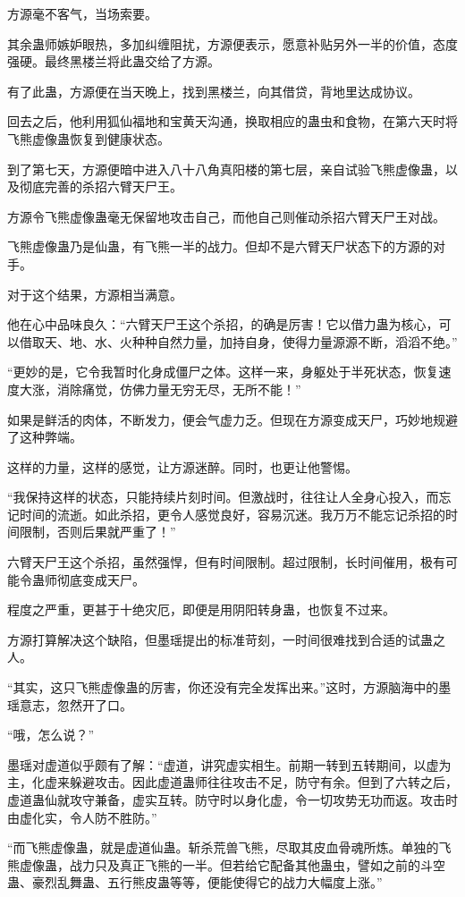 \begin{this_body}
方源毫不客气，当场索要。

其余蛊师嫉妒眼热，多加纠缠阻扰，方源便表示，愿意补贴另外一半的价值，态度强硬。最终黑楼兰将此蛊交给了方源。

有了此蛊，方源便在当天晚上，找到黑楼兰，向其借贷，背地里达成协议。

回去之后，他利用狐仙福地和宝黄天沟通，换取相应的蛊虫和食物，在第六天时将飞熊虚像蛊恢复到健康状态。

到了第七天，方源便暗中进入八十八角真阳楼的第七层，亲自试验飞熊虚像蛊，以及彻底完善的杀招六臂天尸王。

方源令飞熊虚像蛊毫无保留地攻击自己，而他自己则催动杀招六臂天尸王对战。

飞熊虚像蛊乃是仙蛊，有飞熊一半的战力。但却不是六臂天尸状态下的方源的对手。

对于这个结果，方源相当满意。

他在心中品味良久：“六臂天尸王这个杀招，的确是厉害！它以借力蛊为核心，可以借取天、地、水、火种种自然力量，加持自身，使得力量源源不断，滔滔不绝。”

“更妙的是，它令我暂时化身成僵尸之体。这样一来，身躯处于半死状态，恢复速度大涨，消除痛觉，仿佛力量无穷无尽，无所不能！”

如果是鲜活的肉体，不断发力，便会气虚力乏。但现在方源变成天尸，巧妙地规避了这种弊端。

这样的力量，这样的感觉，让方源迷醉。同时，也更让他警惕。

“我保持这样的状态，只能持续片刻时间。但激战时，往往让人全身心投入，而忘记时间的流逝。如此杀招，更令人感觉良好，容易沉迷。我万万不能忘记杀招的时间限制，否则后果就严重了！”

六臂天尸王这个杀招，虽然强悍，但有时间限制。超过限制，长时间催用，极有可能令蛊师彻底变成天尸。

程度之严重，更甚于十绝灾厄，即便是用阴阳转身蛊，也恢复不过来。

方源打算解决这个缺陷，但墨瑶提出的标准苛刻，一时间很难找到合适的试蛊之人。

“其实，这只飞熊虚像蛊的厉害，你还没有完全发挥出来。”这时，方源脑海中的墨瑶意志，忽然开了口。

“哦，怎么说？”

墨瑶对虚道似乎颇有了解：“虚道，讲究虚实相生。前期一转到五转期间，以虚为主，化虚来躲避攻击。因此虚道蛊师往往攻击不足，防守有余。但到了六转之后，虚道蛊仙就攻守兼备，虚实互转。防守时以身化虚，令一切攻势无功而返。攻击时由虚化实，令人防不胜防。”

“而飞熊虚像蛊，就是虚道仙蛊。斩杀荒兽飞熊，尽取其皮血骨魂所炼。单独的飞熊虚像蛊，战力只及真正飞熊的一半。但若给它配备其他蛊虫，譬如之前的斗空蛊、豪烈乱舞蛊、五行熊皮蛊等等，便能使得它的战力大幅度上涨。”


\end{this_body}
